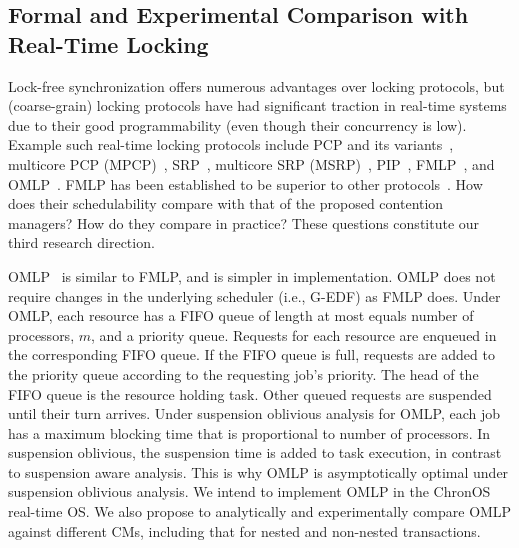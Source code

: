 \documentclass[12pt,english]{report}
\begin{document}
\subsection{Formal and Experimental Comparison with Real-Time Locking} 

Lock-free synchronization offers numerous advantages over locking protocols, but (coarse-grain) locking protocols have had significant traction in real-time systems due to their good programmability (even though their concurrency is low).  Example such real-time locking protocols include PCP and its variants~\cite{chen1990dynamic,6031129,Rajkumar:1991:SRS:532621,sha1990priority}, multicore PCP (MPCP)~\cite{lakshmanan2009coordinated,rajkumar2002real}, SRP~\cite{Buttazzo:2004:HRC:1027504, baker1991stack}, multicore SRP (MSRP)~\cite{gai2003comparison}, PIP~\cite{easwaran2009resource}, FMLP~\cite{key-4,brandenburg2008implementation,holman2006locking}, and OMLP~\cite{Baruah:2007:TMG:1338441.1338647}. FMLP has been established to be superior to other protocols~\cite{brandenburg2008comparison}. How does their schedulability compare with that of the proposed contention managers? How do they compare in practice? These questions constitute our third research direction. 


OMLP~\cite{key-3} is similar to FMLP, and is simpler in implementation. OMLP does not require changes in the underlying scheduler (i.e., G-EDF) as FMLP does. Under OMLP, each resource has a FIFO queue of length at most equals number of processors, $m$, and a priority queue. Requests for each resource are enqueued in the corresponding FIFO queue. If the FIFO queue is full, requests are added to the priority queue according to the requesting job's priority. The head of the FIFO queue is the resource holding task. Other queued requests are suspended until their turn arrives. Under suspension oblivious analysis for OMLP, each job has a maximum blocking time that is proportional to number of processors. In suspension oblivious, the suspension time is added to task execution, in contrast to suspension aware analysis. This is why
OMLP is asymptotically optimal under suspension oblivious analysis. We intend to implement OMLP in the ChronOS real-time OS. We also propose to analytically and experimentally compare OMLP against different CMs, including that for nested and non-nested transactions.




\end{document}
